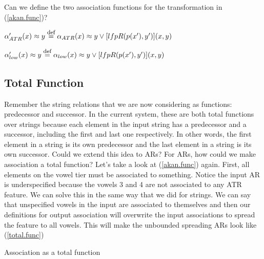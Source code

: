 \documentclass[,doc,floatsintext]{apa6}
\def\defeq{\mathrel{\buildrel \mbox{\footnotesize def} \over =}}
\theoremstyle{definition}
\theoremstyle{definition}
\theoremstyle{definition}
\theoremstyle{remark}
\begin{document}
\noindent Can we define the two association functions for the
transformation in (\ref{akan.func})?

\noindent \(\alpha_{ATR}'(x)\approx y \defeq \alpha_{ATR}(x)\approx y\vee [lfp R(p(x'), y')](x,y)\)

\noindent \(\alpha_{low}'(x)\approx y \defeq \alpha_{low}(x)\approx y\vee [lfp R(p(x'), y')](x,y)\)

\subsection{Total Function}\label{total-function}

Remember the string relations that we are now considering as functions:
predecessor and successor. In the current system, these are both total
functions over strings because each element in the input string has a
predecessor and a successor, including the first and last one
respectively. In other words, the first element in a string is its own
predecessor and the last element in a string is its own successor. Could
we extend this idea to ARs? For ARs, how could we make association a
total function? Let's take a look at (\ref{akan.func}) again. First, all
elements on the vowel tier must be associated to something. Notice the
input AR is underspecified because the vowels 3 and 4 are not associated
to any ATR feature. We can solve this in the same way that we did for
strings. We can say that unspecified vowels in the input are associated
to themselves and then our definitions for output association will
overwrite the input associations to spread the feature to all vowels.
This will make the unbounded spreading ARs look like (\ref{total.func})

\begin{exe}
\ex \label{total.func} Association as a total function \\
\end{exe}
\end{document}
